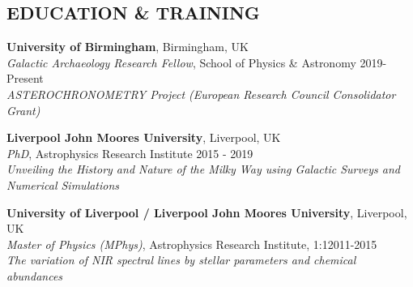 \documentclass[margin]{res}
\begin{document}
\begin{resume}


\section{EDUCATION \& TRAINING}
\textbf{University of Birmingham}, Birmingham, UK\\
{\sl Galactic Archaeology Research Fellow}, School of Physics \& Astronomy \hfill 2019-Present\\
\emph{ASTEROCHRONOMETRY Project (European Research Council Consolidator Grant)}

\textbf{Liverpool John Moores University}, Liverpool, UK\\
{\sl PhD}, Astrophysics Research Institute \hfill 2015 - 2019\\
\emph{Unveiling the History and Nature of the Milky Way using Galactic Surveys and Numerical Simulations}

\textbf{University of Liverpool / Liverpool John Moores University}, Liverpool, UK\\
{\sl Master of Physics (MPhys)}, Astrophysics Research Institute, 1:1\hfill 2011-2015
\\
\emph{The variation of NIR spectral lines by stellar parameters and chemical abundances}



\end{resume}
\end{document}
